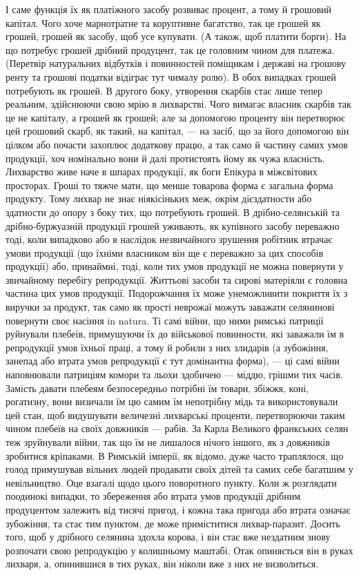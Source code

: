 \parcont{}  %
І саме функція їх як платіжного засобу розвиває процент, а тому й грошовий
капітал. Чого хоче марнотратне та коруптивне багатство, так це грошей
як грошей, грошей як засобу, щоб усе купувати. (А також, щоб платити борги).
На що потребує грошей дрібний продуцент, так це головним чином для платежа.
(Перетвір натуральних відбутків і повинностей поміщикам і державі на грошову
ренту та грошові податки відіграє тут чималу ролю). В обох випадках грошей
потребують як грошей. В другого боку, утворення скарбів стає лише тепер реальним,
здійснюючи свою мрію в лихварстві. Чого вимагає власник скарбів так це не капіталу,
а грошей як грошей; але за допомогою проценту він перетворює цей грошовий
скарб, як такий, на капітал, — на засіб, що за його допомогою він цілком або
почасти захоплює додаткову працю, а так само й частину самих умов продукції,
хоч номінально вони й далі протистоять йому як чужа власність.
Лихварство живе наче в шпарах продукції, як боги Епікура в міжсвітових просторах.
Гроші то тяжче мати, що менше товарова форма є загальна форма
продукту. Тому лихвар не знає ніякісіньких меж, окрім дієздатности або здатности
до опору з боку тих, що потребують грошей. В дрібно-селянській та
дрібно-буржуазній продукції грошей уживають, як купівного засобу переважно
тоді, коли випадково або в наслідок незвичайного зрушення робітник втрачає
умови продукції (що їхніми власником він ще є переважно за цих способів продукції)
або, принаймні, тоді, коли тих умов продукції не можна повернути у звичайному перебігу
репродукції. Життьові засоби та сирові матеріяли є головна частина цих умов
продукції. Подорожчання їх може унеможливити покриття їх з виручки за продукт,
так само як прості неврожаї можуть заважати селянинові повернути своє насіння in
natura. Ті самі війни, що ними римські патриції руйнували плебеїв, примушуючи
їх до військової повинности, які заважали їм в репродукції умов їхньої праці,
а тому й робили з них злидарів (а зубожіння, занепад або втрата умов
репродукції є тут домінантна форма), — ці самі війни наповнювали патриціям
комори та льохи здобичею — міддю, грішми тих часів. Замість давати плебеям
безпосередньо потрібні їм товари, збіжжя, коні, рогатизну, вони визичали
їм цю самим їм непотрібну мідь та використовували цей стан, щоб видушувати
величезні лихварські проценти, перетворюючи таким чином плебеїв на своїх
довжників — рабів. За Карла Великого франкських селян теж зруйнували війни,
так що їм не лишалося нічого іншого, як з довжників зробитися кріпаками.
В Римській імперії, як відомо, дуже часто траплялося, що голод примушував
вільних людей продавати своїх дітей та самих себе багатшим у невільництво. Оце
взагалі щодо цього поворотного пункту. Коли ж розглядати поодинокі випадки,
то збереження або втрата умов продукції дрібним продуцентом залежить від
тисячі пригод, і кожна така пригода або втрата означає зубожіння, та стає
тим пунктом, де може приміститися лихвар-паразит. Досить того, щоб у дрібного
селянина здохла корова, і він стає вже нездатним знову розпочати свою репродукцію
у колишньому маштабі. Отак опиняється він в руках лихваря, а, опинившися
в тих руках, він ніколи вже з них не визволиться.

